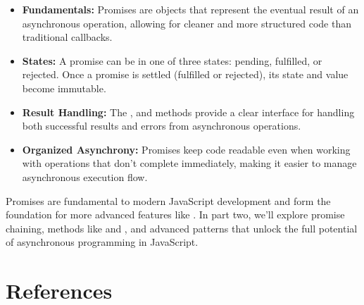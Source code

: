 \begin{itemize}
    \item \textbf{\textcolor{accentColor}{Fundamentals:}} Promises are objects that represent the eventual result of an asynchronous operation, allowing for cleaner and more structured code than traditional callbacks.
    
    \item \textbf{\textcolor{accentColor}{States:}} A promise can be in one of three states: pending, fulfilled, or rejected. Once a promise is settled (fulfilled or rejected), its state and value become immutable.
    
    \item \textbf{\textcolor{accentColor}{Result Handling:}} The ,  and  methods provide a clear interface for handling both successful results and errors from asynchronous operations.
    
    \item \textbf{\textcolor{accentColor}{Organized Asynchrony:}} Promises keep code readable even when working with operations that don't complete immediately, making it easier to manage asynchronous execution flow.
\end{itemize}

Promises are fundamental to modern JavaScript development and form the foundation for more advanced features like . In part two, we'll explore promise chaining, methods like  and , and advanced patterns that unlock the full potential of asynchronous programming in JavaScript.

\section{References}

